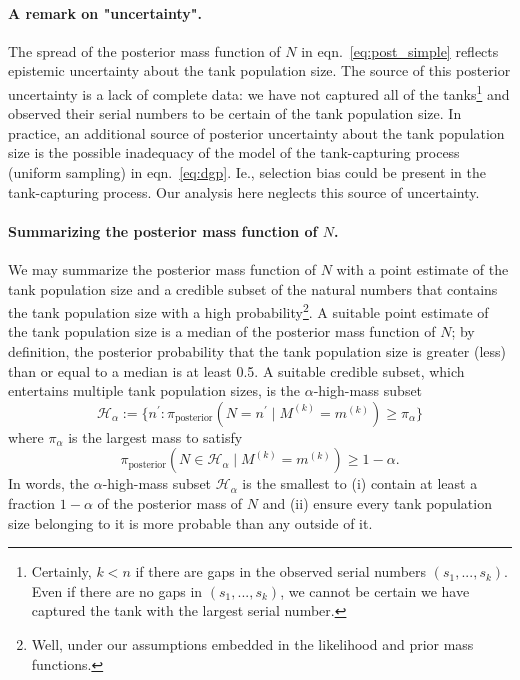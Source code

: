 \documentclass[11pt, oneside]{article}
\newcommand{\data}{$(s_1, ..., s_k)$\xspace}
\begin{document}
\paragraph{A remark on "uncertainty".}
The spread of the posterior mass function of $N$ in eqn.~\ref{eq:post_simple} reflects epistemic \cite{fox2011distinguishing} uncertainty about the tank population size.
The source of this posterior uncertainty is a lack of complete data: we have not captured all of the tanks\footnote{
Certainly, $k<n$ if there are gaps in the observed serial numbers \data. Even if there are no gaps in \data, we cannot be certain we have captured the tank with the largest serial number.
} and observed their serial numbers to be certain of the tank population size.
In practice, an additional source of posterior uncertainty about the tank population size is the possible inadequacy of the model of the tank-capturing process (uniform sampling) in eqn.~\ref{eq:dgp}. Ie., selection bias could be present in the tank-capturing process. Our analysis here neglects this source of uncertainty. 

\paragraph{Summarizing the posterior mass function of $N$.}
We may summarize the posterior mass function of $N$ with a point estimate of the tank population size and a credible subset of the natural numbers that contains the tank population size with a high probability\footnote{Well, under our assumptions embedded in the likelihood and prior mass functions.}.
A suitable point estimate of the tank population size is a median of the posterior mass function of $N$; by definition, the posterior probability that the tank population size is greater (less) than or equal to a median is at least 0.5.
A suitable credible subset, which entertains multiple tank population sizes, is the $\alpha$-high-mass subset \cite{hyndman1996computing}
\begin{equation}
	\mathcal{H}_\alpha := \{n^\prime : \pi_{\text{posterior}}(N=n^\prime \mid M^{(k)}=m^{(k)}) \geq \pi_\alpha\}
\end{equation} where $\pi_\alpha$ is the largest mass to satisfy 
\begin{equation}
	\pi_{\text{posterior}}(N \in \mathcal{H}_\alpha \mid M^{(k)}=m^{(k)}) \geq 1 - \alpha.
\end{equation}
In words, the $\alpha$-high-mass subset $\mathcal{H}_\alpha$ is the smallest to (i) contain at least a fraction $1-\alpha$ of the posterior mass of $N$ and (ii) ensure every tank population size belonging to it is more probable than any outside of it.
\end{document}
